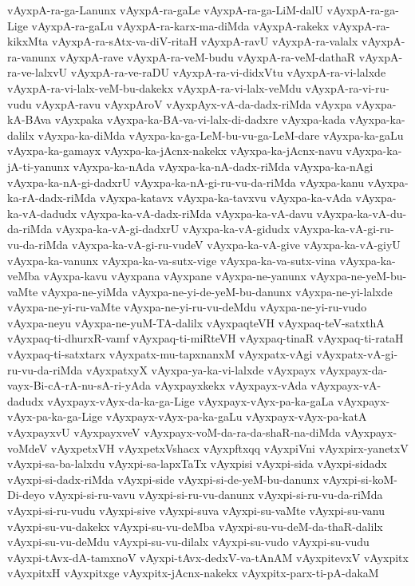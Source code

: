 {vAyxpA-ra-ga-Lanunx
vAyxpA-ra-gaLe
vAyxpA-ra-ga-LiM-dalU
vAyxpA-ra-ga-Lige
vAyxpA-ra-gaLu
vAyxpA-ra-karx-ma-diMda
vAyxpA-rakekx
vAyxpA-ra-kikxMta
vAyxpA-ra-sAtx-va-diV-ritaH
vAyxpA-ravU
vAyxpA-ra-valalx
vAyxpA-ra-vanunx
vAyxpA-rave
vAyxpA-ra-veM-budu
vAyxpA-ra-veM-dathaR
vAyxpA-ra-ve-lalxvU
vAyxpA-ra-ve-raDU
vAyxpA-ra-vi-didxVtu
vAyxpA-ra-vi-lalxde
vAyxpA-ra-vi-lalx-veM-bu-dakekx
vAyxpA-ra-vi-lalx-veMdu
vAyxpA-ra-vi-ru-vudu
vAyxpA-ravu
vAyxpAroV
vAyxpAyx-vA-da-dadx-riMda
vAyxpa
vAyxpa-kA-BAva
vAyxpaka
vAyxpa-ka-BA-va-vi-lalx-di-dadxre
vAyxpa-kada
vAyxpa-ka-dalilx
vAyxpa-ka-diMda
vAyxpa-ka-ga-LeM-bu-vu-ga-LeM-dare
vAyxpa-ka-gaLu
vAyxpa-ka-gamayx
vAyxpa-ka-jAcnx-nakekx
vAyxpa-ka-jAcnx-navu
vAyxpa-ka-jA-ti-yanunx
vAyxpa-ka-nAda
vAyxpa-ka-nA-dadx-riMda
vAyxpa-ka-nAgi
vAyxpa-ka-nA-gi-dadxrU
vAyxpa-ka-nA-gi-ru-vu-da-riMda
vAyxpa-kanu
vAyxpa-ka-rA-dadx-riMda
vAyxpa-katavx
vAyxpa-ka-tavxvu
vAyxpa-ka-vAda
vAyxpa-ka-vA-dadudx
vAyxpa-ka-vA-dadx-riMda
vAyxpa-ka-vA-davu
vAyxpa-ka-vA-du-da-riMda
vAyxpa-ka-vA-gi-dadxrU
vAyxpa-ka-vA-gidudx
vAyxpa-ka-vA-gi-ru-vu-da-riMda
vAyxpa-ka-vA-gi-ru-vudeV
vAyxpa-ka-vA-give
vAyxpa-ka-vA-giyU
vAyxpa-ka-vanunx
vAyxpa-ka-va-sutx-vige
vAyxpa-ka-va-sutx-vina
vAyxpa-ka-veMba
vAyxpa-kavu
vAyxpana
vAyxpane
vAyxpa-ne-yanunx
vAyxpa-ne-yeM-bu-vaMte
vAyxpa-ne-yiMda
vAyxpa-ne-yi-de-yeM-bu-danunx
vAyxpa-ne-yi-lalxde
vAyxpa-ne-yi-ru-vaMte
vAyxpa-ne-yi-ru-vu-deMdu
vAyxpa-ne-yi-ru-vudo
vAyxpa-neyu
vAyxpa-ne-yuM-TA-dalilx
vAyxpaqteVH
vAyxpaq-teV-satxthA
vAyxpaq-ti-dhurxR-vamf
vAyxpaq-ti-miRteVH
vAyxpaq-tinaR
vAyxpaq-ti-rataH
vAyxpaq-ti-satxtarx
vAyxpatx-mu-tapxnanxM
vAyxpatx-vAgi
vAyxpatx-vA-gi-ru-vu-da-riMda
vAyxpatxyX
vAyxpa-ya-ka-vi-lalxde
vAyxpayx
vAyxpayx-da-vayx-Bi-cA-rA-nu-sA-ri-yAda
vAyxpayxkekx
vAyxpayx-vAda
vAyxpayx-vA-dadudx
vAyxpayx-vAyx-da-ka-ga-Lige
vAyxpayx-vAyx-pa-ka-gaLa
vAyxpayx-vAyx-pa-ka-ga-Lige
vAyxpayx-vAyx-pa-ka-gaLu
vAyxpayx-vAyx-pa-katA
vAyxpayxvU
vAyxpayxveV
vAyxpayx-voM-da-ra-da-shaR-na-diMda
vAyxpayx-voMdeV
vAyxpetxVH
vAyxpetxVshacx
vAyxpftxqq
vAyxpiVni
vAyxpirx-yanetxV
vAyxpi-sa-ba-lalxdu
vAyxpi-sa-lapxTaTx
vAyxpisi
vAyxpi-sida
vAyxpi-sidadx
vAyxpi-si-dadx-riMda
vAyxpi-side
vAyxpi-si-de-yeM-bu-danunx
vAyxpi-si-koM-Di-deyo
vAyxpi-si-ru-vavu
vAyxpi-si-ru-vu-danunx
vAyxpi-si-ru-vu-da-riMda
vAyxpi-si-ru-vudu
vAyxpi-sive
vAyxpi-suva
vAyxpi-su-vaMte
vAyxpi-su-vanu
vAyxpi-su-vu-dakekx
vAyxpi-su-vu-deMba
vAyxpi-su-vu-deM-da-thaR-dalilx
vAyxpi-su-vu-deMdu
vAyxpi-su-vu-dilalx
vAyxpi-su-vudo
vAyxpi-su-vudu
vAyxpi-tAvx-dA-tamxnoV
vAyxpi-tAvx-dedxV-va-tAnAM
vAyxpitevxV
vAyxpitx
vAyxpitxH
vAyxpitxge
vAyxpitx-jAcnx-nakekx
vAyxpitx-parx-ti-pA-dakaM
}
